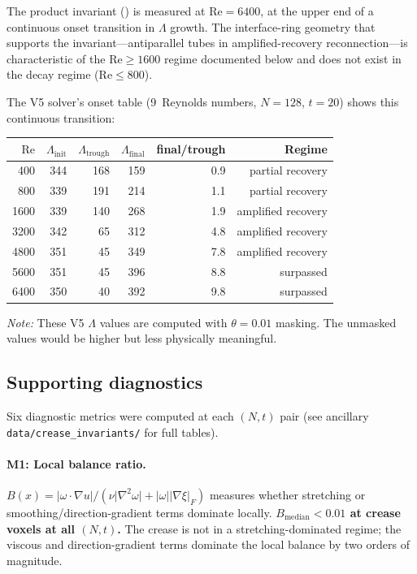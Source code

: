 \documentclass[11pt,a4paper]{article}
\theoremstyle{definition}
\newcommand{\grad}{\nabla}
\newcommand{\lapl}{\nabla^2}
\newcommand{\abs}[1]{\lvert #1 \rvert}
\newcommand{\Rey}{\mathrm{Re}}
\newcommand{\strongclaim}[1]{\textbf{#1}}  %
\begin{document}
The product invariant () is measured at
$\Rey=6400$, at the upper end of a continuous onset transition in
$\Lambda$ growth.  The interface-ring geometry that supports the
invariant---antiparallel tubes in amplified-recovery reconnection---is
characteristic of the $\Rey\geq1600$ regime documented below and
does not exist in the decay regime ($\Rey\leq800$).

The V5 solver's onset table (9~Reynolds numbers, $N{=}128$,
$t{=}20$) shows this continuous transition:

\begin{center}
\begin{tabular}{rrrrrr}
\toprule
$\Rey$ & $\Lambda_{\mathrm{init}}$ & $\Lambda_{\mathrm{trough}}$
  & $\Lambda_{\mathrm{final}}$ & final/trough & Regime \\
\midrule
400   & 344 & 168 & 159 & 0.9  & partial recovery \\
800   & 339 & 191 & 214 & 1.1  & partial recovery \\
1600  & 339 & 140 & 268 & 1.9  & amplified recovery \\
3200  & 342 & 65  & 312 & 4.8  & amplified recovery \\
4800  & 351 & 45  & 349 & 7.8  & amplified recovery \\
5600  & 351 & 45  & 396 & 8.8  & surpassed \\
6400  & 350 & 40  & 392 & 9.8  & surpassed \\
\bottomrule
\end{tabular}
\end{center}

\emph{Note:} These V5 $\Lambda$ values are computed with $\theta=0.01$
masking.  The unmasked values would be higher but less physically
meaningful.

\subsection{Supporting diagnostics}

Six diagnostic metrics were computed at each $(N,t)$ pair
(see ancillary \texttt{data/crease\_invariants/} for full tables).

\paragraph{M1: Local balance ratio.}
$B(x) = \abs{\omega\cdot\grad u}/(\nu\abs{\lapl\omega}
+ \abs{\omega}\abs{\grad\xi}_F)$ measures whether stretching or
smoothing/direction-gradient terms dominate locally.
\strongclaim{$B_{\mathrm{median}}<0.01$ at crease voxels at all
$(N,t)$.}  The crease is not in a stretching-dominated regime; the
viscous and direction-gradient terms dominate the local balance by
two orders of magnitude.
\end{document}
